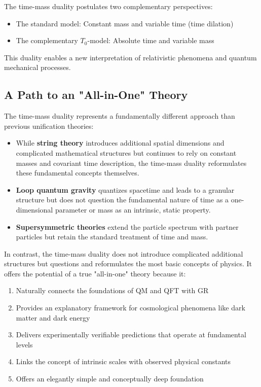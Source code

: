 \documentclass[12pt,a4paper]{article}  %
\begin{document}
	The time-mass duality postulates two complementary perspectives:
	\begin{itemize}
		\item The standard model: Constant mass and variable time (time dilation)
		\item The complementary $T_0$-model: Absolute time and variable mass
	\end{itemize}
	
	This duality enables a new interpretation of relativistic phenomena and quantum mechanical processes.
	
	\subsection{A Path to an "All-in-One" Theory}
	
	The time-mass duality represents a fundamentally different approach than previous unification theories:
	
	\begin{itemize}
		\item While \textbf{string theory} introduces additional spatial dimensions and complicated mathematical structures but continues to rely on constant masses and covariant time description, the time-mass duality reformulates these fundamental concepts themselves.
		
		\item \textbf{Loop quantum gravity} quantizes spacetime and leads to a granular structure but does not question the fundamental nature of time as a one-dimensional parameter or mass as an intrinsic, static property.
		
		\item \textbf{Supersymmetric theories} extend the particle spectrum with partner particles but retain the standard treatment of time and mass.
	\end{itemize}
	
	In contrast, the time-mass duality does not introduce complicated additional structures but questions and reformulates the most basic concepts of physics. It offers the potential of a true "all-in-one" theory because it:
	
	\begin{enumerate}
		\item Naturally connects the foundations of QM and QFT with GR
		\item Provides an explanatory framework for cosmological phenomena like dark matter and dark energy
		\item Delivers experimentally verifiable predictions that operate at fundamental levels
		\item Links the concept of intrinsic scales with observed physical constants
		\item Offers an elegantly simple and conceptually deep foundation
	\end{enumerate}
	
\end{document}
